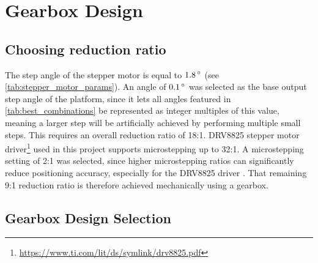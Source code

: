 \section{Gearbox Design}
\subsection{Choosing reduction ratio}
The step angle of the stepper motor is equal to $1.8\,\degree$ (see \cref{tab:stepper_motor_params}). 
An angle of $0.1\,\degree$ was selected as the base output step angle of the platform, since it lets all angles featured in \cref{tab:best_combinations} be represented as integer multiples of this value, meaning a larger step will be artificially achieved by performing multiple small steps.
This requires an overall reduction ratio of 18:1.
DRV8825 stepper motor driver\footnote{\url{https://www.ti.com/lit/ds/symlink/drv8825.pdf}} used in this project supports microstepping up to 32:1. A microstepping setting of 2:1 was selected, since higher microstepping ratios can significantly reduce positioning accuracy, especially for the DRV8825 driver \cite[sec.~Texas Instruments DRV8825]{by_HowAccurateMicrostepping_2016}.
That remaining 9:1 reduction ratio is therefore achieved mechanically using a gearbox.
\subsection{Gearbox Design Selection}
